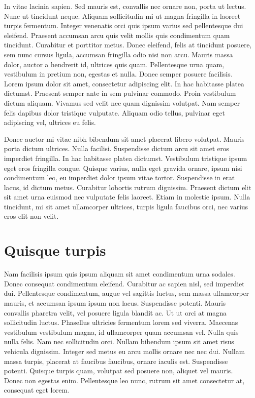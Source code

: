 In vitae lacinia sapien. Sed mauris est, convallis nec ornare non, porta ut lectus. Nunc ut tincidunt neque. Aliquam sollicitudin mi ut magna fringilla in laoreet turpis fermentum. Integer venenatis orci quis ipsum varius sed pellentesque dui eleifend. Praesent accumsan arcu quis velit mollis quis condimentum quam tincidunt. Curabitur et porttitor metus. Donec eleifend, felis at tincidunt posuere, sem nunc cursus ligula, accumsan fringilla odio nisi non arcu. Mauris massa dolor, auctor a hendrerit id, ultrices quis quam. Pellentesque urna quam, vestibulum in pretium non, egestas et nulla. Donec semper posuere facilisis. Lorem ipsum dolor sit amet, consectetur adipiscing elit. In hac habitasse platea dictumst. Praesent semper ante in sem pulvinar commodo. Proin vestibulum dictum aliquam. Vivamus sed velit nec quam dignissim volutpat. Nam semper felis dapibus dolor tristique vulputate. Aliquam odio tellus, pulvinar eget adipiscing vel, ultrices eu felis.

Donec auctor mi vitae nibh bibendum sit amet placerat libero volutpat. Mauris porta dictum ultrices. Nulla facilisi. Suspendisse dictum arcu sit amet eros imperdiet fringilla. In hac habitasse platea dictumst. Vestibulum tristique ipsum eget eros fringilla congue. Quisque varius, nulla eget gravida ornare, ipsum nisi condimentum leo, eu imperdiet dolor ipsum vitae tortor. Suspendisse in erat lacus, id dictum metus. Curabitur lobortis rutrum dignissim. Praesent dictum elit sit amet urna euismod nec vulputate felis laoreet. Etiam in molestie ipsum. Nulla tincidunt, mi sit amet ullamcorper ultrices, turpis ligula faucibus orci, nec varius eros elit non velit.

\chapter{Quisque turpis}

Nam facilisis ipsum quis ipsum aliquam sit amet condimentum urna sodales. Donec consequat condimentum eleifend. Curabitur ac sapien nisl, sed imperdiet dui. Pellentesque condimentum, augue vel sagittis luctus, sem massa ullamcorper mauris, et accumsan ipsum ipsum non lacus. Suspendisse potenti. Mauris convallis pharetra velit, vel posuere ligula blandit ac. Ut ut orci at magna sollicitudin luctus. Phasellus ultricies fermentum lorem sed viverra. Maecenas vestibulum vestibulum magna, id ullamcorper quam accumsan vel. Nulla quis nulla felis. Nam nec sollicitudin orci. Nullam bibendum ipsum sit amet risus vehicula dignissim. Integer sed metus eu arcu mollis ornare nec nec dui. Nullam massa turpis, placerat at faucibus faucibus, ornare iaculis est. Suspendisse potenti. Quisque turpis quam, volutpat sed posuere non, aliquet vel mauris. Donec non egestas enim. Pellentesque leo nunc, rutrum sit amet consectetur at, consequat eget lorem.

